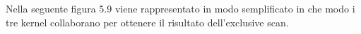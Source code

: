 \documentclass[12pt,a4paper]{report}
\begin{document}
Nella seguente figura 5.9 viene rappresentato in modo semplificato in che modo i tre kernel collaborano per ottenere il risultato dell'exclusive scan.
\begin{figure}[H]
\centering
\begin{floatrow}[1]
\end{floatrow}
\end{figure} 


\end{document}
